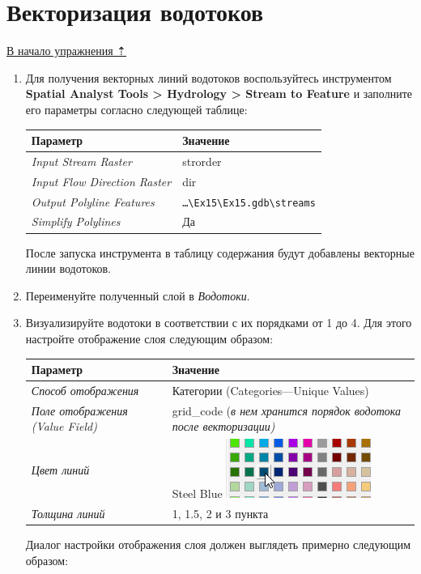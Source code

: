 \documentclass[]{book}
\theoremstyle{definition}
\theoremstyle{definition}
\theoremstyle{definition}
\theoremstyle{remark}
\begin{document}
\hypertarget{dem-vectorize}{%
\section{Векторизация водотоков}\label{dem-vectorize}}

\protect\hyperlink{dem}{В начало упражнения ⇡}

\begin{enumerate}
\def\labelenumi{\arabic{enumi}.}
\item
  Для получения векторных линий водотоков воспользуйтесь инструментом
  \textbf{Spatial Analyst Tools \textgreater{} Hydrology \textgreater{}
  Stream to Feature} и заполните его параметры согласно следующей
  таблице:

  \begin{longtable}[]{@{}ll@{}}
  \toprule
  Параметр & Значение\tabularnewline
  \midrule
  \endhead
  \emph{Input Stream Raster} & strorder\tabularnewline
  \emph{Input Flow Direction Raster} & dir\tabularnewline
  \emph{Output Polyline Features} &
  \texttt{\ldots{}\textbackslash{}Ex15\textbackslash{}Ex15.gdb\textbackslash{}streams}\tabularnewline
  \emph{Simplify Polylines} & Да\tabularnewline
  \bottomrule
  \end{longtable}

  После запуска инструмента в таблицу содержания будут добавлены
  векторные линии водотоков.
\item
  Переименуйте полученный слой в \emph{Водотоки}.
\item
  Визуализируйте водотоки в соответствии с их порядками от 1 до 4. Для
  этого настройте отображение слоя следующим образом:

  \begin{longtable}[]{@{}ll@{}}
  \toprule
  Параметр & Значение\tabularnewline
  \midrule
  \endhead
  \emph{Способ отображения} & Категории (Categories---Unique
  Values)\tabularnewline
  \emph{Поле отображения (Value Field)} & grid\_code (\emph{в нем
  хранится порядок водотока после векторизации)}\tabularnewline
  \emph{Цвет линий} & Steel Blue
  \includegraphics{images/Ex15/image16.png}\tabularnewline
  \emph{Толщина линий} & 1, 1.5, 2 и 3 пункта\tabularnewline
  \bottomrule
  \end{longtable}

  Диалог настройки отображения слоя должен выглядеть примерно следующим
  образом:


\end{enumerate}
\end{document}
